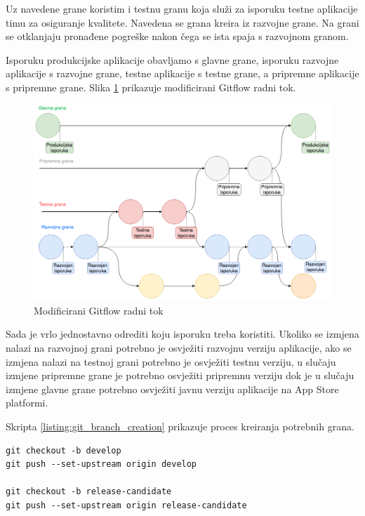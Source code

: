 \documentclass[times, utf8, diplomski, numeric]{fer}
\begin{document}
\begin{appendices}
Uz navedene grane koristim i testnu granu koja služi za isporuku testne aplikacije timu za osiguranje kvalitete. Navedena se grana kreira iz razvojne grane. Na grani se otklanjaju pronađene pogreške nakon čega se ista spaja s razvojnom granom.

Isporuku produkcijske aplikacije obavljamo s glavne grane, isporuku razvojne aplikacije s razvojne grane, testne aplikacije s testne grane, a pripremne aplikacije s pripremne grane. Slika \ref{fig:ModificiraniGitflowTokRaka} prikazuje modificirani Gitflow radni tok.

\begin{figure}
\centering
\includegraphics[scale=0.4]{ModificiraniGitflowTokRaka}
\caption{Modificirani Gitflow radni tok}
\label{fig:ModificiraniGitflowTokRaka}
\end{figure}

Sada je vrlo jednostavno odrediti koju isporuku treba koristiti. Ukoliko se izmjena nalazi na razvojnoj grani potrebno je osvježiti razvojnu verziju aplikacije, ako se izmjena nalazi na testnoj grani potrebno je osvježiti testnu verziju, u slučaju izmjene pripremne grane je potrebno osvježiti pripremnu verziju dok je u slučaju izmjene glavne grane potrebno osvježiti javnu verziju aplikacije na App Store platformi.

Skripta \ref{listing:git_branch_creation} prikazuje proces kreiranja potrebnih grana.

\begin{lstlisting}[caption=Kreiranje potrebnih grana Gitflow radnog toka, label=listing:git_branch_creation]
git checkout -b develop
git push --set-upstream origin develop

git checkout -b release-candidate
git push --set-upstream origin release-candidate


\end{lstlisting}
\end{appendices}
\end{document}
